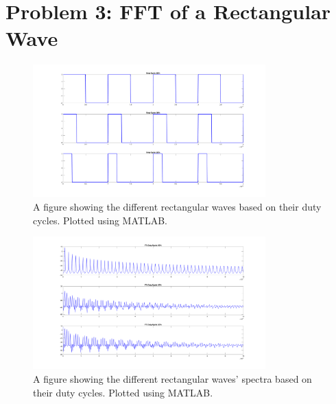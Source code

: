 \newpage
\section{Problem 3: FFT of a Rectangular Wave}

\begin{figure}[H]
    \centering
    \includegraphics[width=0.8\textwidth]{images/prelab_problem_3_time.png}
    \caption{A figure showing the different rectangular waves based on their duty cycles. Plotted using MATLAB.}
\end{figure}

\begin{figure}[H]
    \centering
    \includegraphics[width=0.8\textwidth]{images/prelab_problem_3_freq.png}
    \caption{A figure showing the different rectangular waves' spectra based on their duty cycles. Plotted using MATLAB.}
\end{figure}


